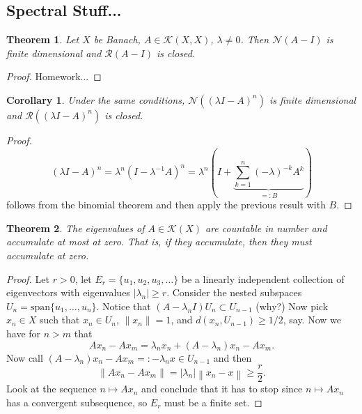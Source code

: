 \documentclass[letterpaper,twoside,11pt]{article}
\theoremstyle{mystyle}
\newtheorem{theorem}{Theorem}[section]
\newtheorem{corollary}{Corollary}[theorem]
\begin{document}
\subsection*{Spectral Stuff...}
\begin{tcolorbox}[colback=red!5!white,colframe=red!75!black]
\begin{theorem}
  Let $X$ be Banach, $A\in \mathcal K(X,X)$, $\lambda\neq 0$. Then $\mathcal N(A-I)$ is finite dimensional and $\mathcal R(A-I)$ is closed. 
\end{theorem}
\end{tcolorbox}
\begin{proof}
  Homework...
\end{proof}
\begin{tcolorbox}[colback=gray!5!white,colframe=red!75!black]
\begin{corollary}
  Under the same conditions, $\mathcal N\left( (\lambda I -A)^n\right)$ is finite dimensional and $\mathcal R\left( (\lambda I -A)^n\right)$ is closed.  
\end{corollary}
\end{tcolorbox}
\begin{proof}
  \[{\left( {\lambda I - A} \right)^n} = {\lambda ^n}{\left( {I - {\lambda ^{ - 1}}A} \right)^n} = {\lambda ^n}\left( {I + \underbrace {\sum\limits_{k = 1}^n {{{\left( { - \lambda } \right)}^{ - k}}{A^k}} }_{ = :B}} \right)\] follows from the binomial theorem and then apply the previous result with $B$. 
\end{proof}
\begin{tcolorbox}[colback=red!5!white,colframe=red!75!black]
\begin{theorem}
  The eigenvalues of $A\in \mathcal K (X)$ are countable in number and accumulate at most at zero. That is, if they accumulate, then they must accumulate at zero. 
\end{theorem}
\end{tcolorbox}
\begin{proof}
  Let $r>0$, let $E_r=\{u_1, u_2, u_3, \dots\}$ be a linearly independent collection of eigenvectors with eigenvalues $|\lambda_n|\geq r$. Consider the nested subspaces $U_n = \text{span} \{u_1,\dots, u_n\}$. Notice that $(A-\lambda_n I) U_n \subset U_{n-1}$ \color{red}(why?)\color{black} Now pick $x_n \in X$ such that $x_n \in U_n$, $\|x_n\|=1$, and $d(x_n, U_{n-1}) \geq 1/2$, say. Now we have for $n>m$ that 
  \[Ax_n - Ax_m = \lambda_n x_n + (A-\lambda_n) x_n - Ax_m.\] Now call $(A-\lambda_n) x_n - Ax_m =: -\lambda_n x\in U_{n-1}$ and then 
  \[\left\| {A{x_n} - A{x_m}} \right\| = \left| {{\lambda _n}} \right|\left\| {{x_n} - x} \right\| \geq \frac{r}{2}.\]
  Look at the sequence $n\mapsto Ax_n$ and conclude that it has to stop since $n\mapsto Ax_n$ has a convergent subsequence, so $E_r$ must be a finite set. 
\end{proof}
\end{document}
